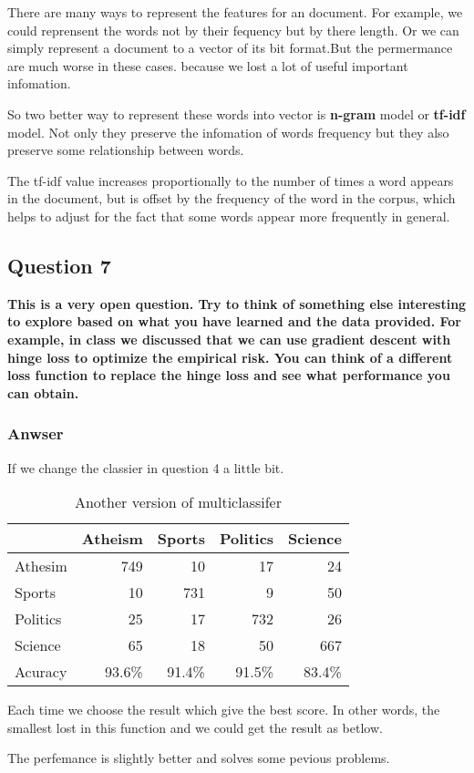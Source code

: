 \documentclass{article}
\begin{document}
There are many ways to represent the features for an document. For example, we
could reprensent the words not by their fequency but by there length. Or we can
simply represent a document to a vector of its bit format.But the permermance
are much worse in these cases. because we lost a lot of useful important
infomation.

So two better way to represent these words into vector is \textbf{n-gram} model or
\textbf{tf-idf} model. Not only they preserve the infomation of words frequency but
they also preserve some relationship between words.

The tf-idf value increases proportionally to the number of times a word appears
in the document, but is offset by the frequency of the word in the corpus, which
helps to adjust for the fact that some words appear more frequently in general.

\subsection{Question 7}
\label{sec-1-7}

\textbf{This is a very open question. Try to think of something else interesting to explore based on what you have learned and the data provided. For example, in class we discussed that we can use gradient descent with hinge loss to optimize the empirical risk. You can think of a different loss function to replace the hinge loss and see what performance you can obtain.}

\subsubsection{Anwser}
\label{sec-1-7-1}

If we change the classier in question 4 a little bit.

\begin{table}[htb]
\caption{\label{tab:multi}Another version of multiclassifer}
\centering
\begin{tabular}{lrrrr}
\hline
 & Atheism & Sports & Politics & Science\\
\hline
Athesim & 749 & 10 & 17 & 24\\
Sports & 10 & 731 & 9 & 50\\
Politics & 25 & 17 & 732 & 26\\
Science & 65 & 18 & 50 & 667\\
\hline
Acuracy & 93.6\% & 91.4\% & 91.5\% & 83.4\%\\
\hline
\end{tabular}
\end{table}

Each time we choose the result which give the best score. In other words, the smallest lost in this function and we could get the result as betlow.

The perfemance is slightly better and solves some pevious problems.
\end{document}
